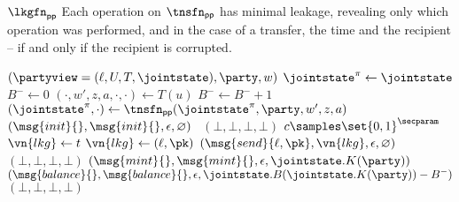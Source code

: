 \begin{leakagefn}{$\lkgfn_{\mathsf{pp}}$}
  Each operation on $\tnsfn_{\mathsf{pp}}$ has minimal leakage, revealing only
  which operation was performed, and in the case of a transfer, the time and
  the recipient -- if and only if the recipient is corrupted.

  \vsep

  \begin{receiveinput*}{$(\partyview = (\ell, U, T, \jointstate), \party, w)$}
    \State \Let $\jointstate^\pi \gets \jointstate$
    \State \Let $B^- \gets 0$
      \State \Let $(\cdot, w', z, a, \cdot, \cdot) \gets T(u)$
        \Let $B^- \gets B^- + 1$
      \EndIf
      \State \Let $(\jointstate^\pi, \cdot) \gets \tnsfn_{\mathsf{pp}}(\jointstate^\pi,
        \party, w', z, a)$
    \EndFor
        \State \Return $(\msg{init}{}, \msg{init}{}, \epsilon, \varnothing)$
      \Else
        ~\Return $(\bot, \bot, \bot, \bot)$
      \EndIf
      \State \Let $c \samples \set{0,1}^\secparam$
        \State \Let $\vn{lkg} \gets t$
          \Let $\vn{lkg} \gets (\ell, \pk)$
        \EndIf
        \State \Return $(\msg{send}{\ell, \pk}, \vn{lkg}, \epsilon, \varnothing)$
      \Else
        ~\Return $(\bot, \bot, \bot, \bot)$
      \EndIf
      \State \Return $(\msg{mint}{}, \msg{mint}{}, \epsilon, \jointstate.K(\party))$
      \State \Return $(\msg{balance}{}, \msg{balance}{}, \epsilon,
        \jointstate.B(\jointstate.K(\party)) - B^-)$
    \Else
      \State \Return $(\bot, \bot, \bot, \bot)$
    \EndIf
  \end{receiveinput*}
\end{leakagefn}
